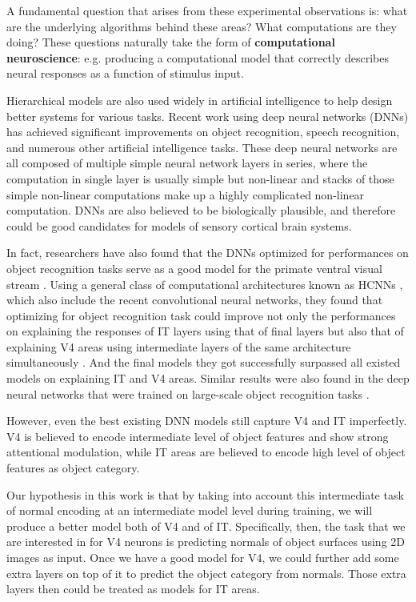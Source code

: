 \documentclass[12pt]{article}
\begin{document}
A fundamental question that arises from these experimental observations is: what are the underlying algorithms behind these areas? What computations are they doing? These questions naturally take the form of \textbf{computational neuroscience}: e.g. producing a computational model that correctly describes neural responses as a function of stimulus input.

Hierarchical models are also used widely in artificial intelligence to help design better systems for various tasks. Recent work using deep neural networks (DNNs) has achieved significant improvements on object recognition, speech recognition, and numerous other artificial intelligence tasks\cite{Krizhevsky, hinton2012deep, lecun2015deep}. These deep neural networks are all composed of multiple simple neural network layers in series, where the computation in single layer is usually simple but non-linear and stacks of those simple non-linear computations make up a highly complicated non-linear computation. DNNs are also believed to be biologically plausible, and therefore could be good candidates for models of sensory cortical brain systems.

In fact, researchers have also found that the DNNs optimized for performances on object recognition tasks serve as a good model for the primate ventral visual stream \cite{Yamins2013, Yamins2014, Cadieu2014}. Using a general class of computational architectures known as HCNNs \cite{lecun1995convolutional}, which also include the recent convolutional neural networks, they found that optimizing for object recognition task could improve not only the performances on explaining the responses of IT layers using that of final layers but also that of explaining V4 areas using intermediate layers of the same architecture simultaneously \cite{Cadieu2014}. And the final models they got successfully surpassed all existed models on explaining IT and V4 areas. Similar results were also found in the deep neural networks that were trained on large-scale object recognition tasks \cite{Yamins2014}.

However, even the best existing DNN models still capture V4 and IT imperfectly. V4 is believed to encode intermediate level of object features and show strong attentional modulation\cite{Roe2012}, while IT areas are believed to encode high level of object features as object category.

Our hypothesis in this work is that by taking into account this intermediate task of normal encoding at an intermediate model level during training, we will produce a better model both of V4 and of IT. Specifically, then, the task that we are interested in for V4 neurons is predicting normals of object surfaces using 2D images as input. Once we have a good model for V4, we could further add some extra layers on top of it to predict the object category from normals. Those extra layers then could be treated as models for IT areas.
\end{document}
